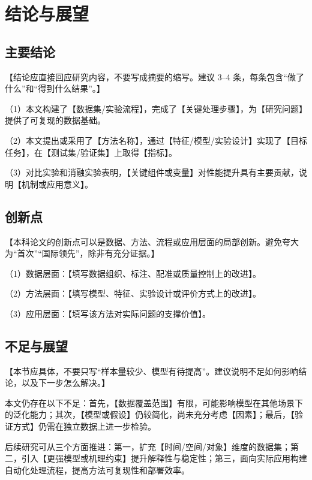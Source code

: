 \section{结论与展望}\label{ch:conclusion}

\subsection{主要结论}

【结论应直接回应研究内容，不要写成摘要的缩写。建议 3--4 条，每条包含“做了什么”和“得到什么结果”。】

（1）本文构建了【数据集/实验流程】，完成了【关键处理步骤】，为【研究问题】提供了可复现的数据基础。

（2）本文提出或采用了【方法名称】，通过【特征/模型/实验设计】实现了【目标任务】，在【测试集/验证集】上取得【指标】。

（3）对比实验和消融实验表明，【关键组件或变量】对性能提升具有主要贡献，说明【机制或应用意义】。

\subsection{创新点}

【本科论文的创新点可以是数据、方法、流程或应用层面的局部创新。避免夸大为“首次”“国际领先”，除非有充分证据。】

（1）数据层面：【填写数据组织、标注、配准或质量控制上的改进】。

（2）方法层面：【填写模型、特征、实验设计或评价方式上的改进】。

（3）应用层面：【填写该方法对实际问题的支撑价值】。

\subsection{不足与展望}

【本节应具体，不要只写“样本量较少、模型有待提高”。建议说明不足如何影响结论，以及下一步怎么解决。】

本文仍存在以下不足：首先，【数据覆盖范围】有限，可能影响模型在其他场景下的泛化能力；其次，【模型或假设】仍较简化，尚未充分考虑【因素】；最后，【验证方式】仍需在独立数据上进一步检验。

后续研究可从三个方面推进：第一，扩充【时间/空间/对象】维度的数据集；第二，引入【更强模型或机理约束】提升解释性与稳定性；第三，面向实际应用构建自动化处理流程，提高方法可复现性和部署效率。
